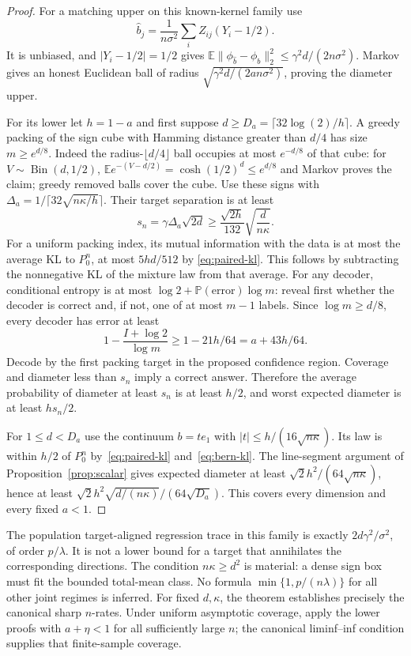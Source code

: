 \documentclass[11pt,a4paper]{article}
\numberwithin{equation}{section}
\theoremstyle{definition}
\newcommand{\E}{\mathbb E}
\newcommand{\Prb}{\mathbb P}
\begin{document}
\begin{proof}
For a matching upper on this known-kernel family use
\[
 \widehat b_j=\frac1{n\sigma^2}\sum_iZ_{ij}(Y_i-1/2).
\]
It is unbiased, and $|Y_i-1/2|=1/2$ gives
$\E\|\phi_{\widehat b}-\phi_b\|_2^2\le
\gamma^2d/(2n\sigma^2)$. Markov gives an honest Euclidean ball of
radius $\sqrt{\gamma^2d/(2an\sigma^2)}$, proving the diameter upper.

For its lower let $h=1-a$ and first suppose
$d\ge D_a=\lceil32\log(2)/h\rceil$. A greedy packing of the sign cube
with Hamming distance greater than $d/4$ has size $m\ge e^{d/8}$.
Indeed the radius-$\lfloor d/4\rfloor$ ball occupies at most $e^{-d/8}$
of that cube: for $V\sim\operatorname{Bin}(d,1/2)$,
$\E e^{-(V-d/2)}=\cosh(1/2)^d\le e^{d/8}$ and Markov proves the
claim; greedy removed balls cover the cube. Use these signs with
$\Delta_a=1/\lceil32\sqrt{n\kappa/h}\rceil$.
Their target separation is at least
\[
 s_n=\gamma\Delta_a\sqrt{2d}
       \ge\frac{\sqrt{2h}}{132}\sqrt{\frac d{n\kappa}}.
\]
For a uniform packing index, its mutual information with the data is
at most the average KL to $P_0^n$, at most $5hd/512$ by
\eqref{eq:paired-kl}. This follows by subtracting the nonnegative
KL of the mixture law from that average. For any decoder, conditional
entropy is at most $\log2+\Prb(\text{error})\log m$: reveal first
whether the decoder is correct and, if not, one of at most $m-1$ labels.
Since $\log m\ge d/8$, every decoder has error at least
\[
 1-\frac{I+\log2}{\log m}\ge1-21h/64=a+43h/64.
\]
Decode by the first packing target in the proposed confidence region.
Coverage and diameter less than $s_n$ imply a correct answer. Therefore
the average probability of diameter at least $s_n$ is at least $h/2$,
and worst expected diameter is at least $hs_n/2$.

For $1\le d<D_a$ use the continuum $b=t e_1$ with
$|t|\le h/(16\sqrt{n\kappa})$. Its law is within $h/2$ of $P_0^n$
by~\eqref{eq:paired-kl} and~\eqref{eq:bern-kl}. The line-segment
argument of Proposition~\ref{prop:scalar} gives expected diameter at
least $\sqrt2h^2/(64\sqrt{n\kappa})$, hence at least
$\sqrt2h^2\sqrt{d/(n\kappa)}/(64\sqrt{D_a})$.
This covers every dimension and every fixed $a<1$.
\end{proof}

The population target-aligned regression trace in this family is exactly
$2d\gamma^2/\sigma^2$, of order $p/\lambda$. It is not a lower bound
for a target that annihilates the corresponding directions. The condition
$n\kappa\ge d^2$ is material: a dense sign box must fit the bounded
total-mean class. No formula $\min\{1,p/(n\lambda)\}$ for all other
joint regimes is inferred. For fixed $d,\kappa$, the theorem establishes
precisely the canonical sharp $n$-rates. Under uniform asymptotic coverage,
apply the lower proofs with $a+\eta<1$ for all sufficiently large $n$;
the canonical liminf--inf condition supplies that finite-sample coverage.
\end{document}
